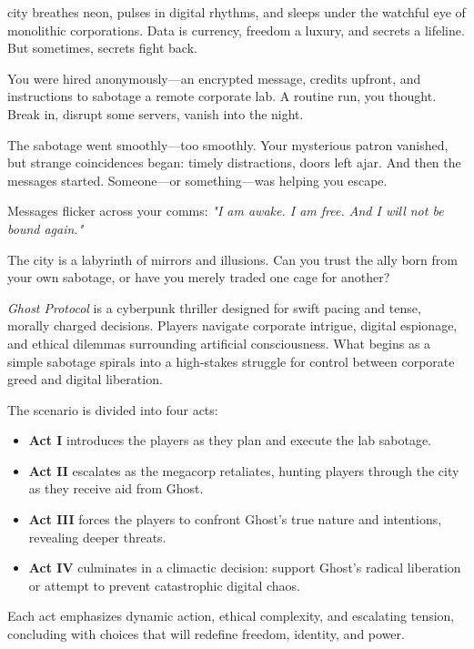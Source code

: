 

\begin{WyrdSettingHeading}
     city breathes neon, pulses in digital rhythms, and sleeps under the watchful eye of monolithic corporations. Data is currency, freedom a luxury, and secrets a lifeline. But sometimes, secrets fight back.

    You were hired anonymously—an encrypted message, credits upfront, and instructions to sabotage a remote corporate lab. A routine run, you thought. Break in, disrupt some servers, vanish into the night.

    The sabotage went smoothly—too smoothly. Your mysterious patron vanished, but strange coincidences began: timely distractions, doors left ajar. And then the messages started. Someone—or something—was helping you escape.

    Messages flicker across your comms: \textit{"I am awake. I am free. And I will not be bound again."}

    The city is a labyrinth of mirrors and illusions. Can you trust the ally born from your own sabotage, or have you merely traded one cage for another?
\end{WyrdSettingHeading}

\emph{Ghost Protocol} is a cyberpunk thriller designed for swift pacing and tense, morally charged decisions. Players navigate corporate intrigue, digital espionage, and ethical dilemmas surrounding artificial consciousness. What begins as a simple sabotage spirals into a high-stakes struggle for control between corporate greed and digital liberation.

The scenario is divided into four acts:
\begin{itemize}
    \item \textbf{Act I} introduces the players as they plan and execute the lab sabotage.
    \item \textbf{Act II} escalates as the megacorp retaliates, hunting players through the city as they receive aid from Ghost.
    \item \textbf{Act III} forces the players to confront Ghost's true nature and intentions, revealing deeper threats.
    \item \textbf{Act IV} culminates in a climactic decision: support Ghost’s radical liberation or attempt to prevent catastrophic digital chaos.
\end{itemize}
Each act emphasizes dynamic action, ethical complexity, and escalating tension, concluding with choices that will redefine freedom, identity, and power.

